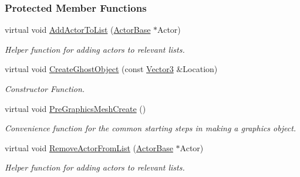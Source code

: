 \subsubsection*{Protected Member Functions}
\begin{DoxyCompactItemize}
\item 
\hypertarget{classMezzanine_1_1AreaEffect_a4a81d9d5920f375aa9a5ff27c1de97e0}{
virtual void \hyperlink{classMezzanine_1_1AreaEffect_a4a81d9d5920f375aa9a5ff27c1de97e0}{AddActorToList} (\hyperlink{classMezzanine_1_1ActorBase}{ActorBase} $\ast$Actor)}
\label{classMezzanine_1_1AreaEffect_a4a81d9d5920f375aa9a5ff27c1de97e0}

\begin{DoxyCompactList}\small\item\em Helper function for adding actors to relevant lists. \item\end{DoxyCompactList}\item 
virtual void \hyperlink{classMezzanine_1_1AreaEffect_a198ad58cec706d508785cbd8e319ba54}{CreateGhostObject} (const \hyperlink{classMezzanine_1_1Vector3}{Vector3} \&Location)
\begin{DoxyCompactList}\small\item\em Constructor Function. \item\end{DoxyCompactList}\item 
\hypertarget{classMezzanine_1_1AreaEffect_ae6d32d28fbe74eec48eaf3f7b5550c1c}{
virtual void \hyperlink{classMezzanine_1_1AreaEffect_ae6d32d28fbe74eec48eaf3f7b5550c1c}{PreGraphicsMeshCreate} ()}
\label{classMezzanine_1_1AreaEffect_ae6d32d28fbe74eec48eaf3f7b5550c1c}

\begin{DoxyCompactList}\small\item\em Convenience function for the common starting steps in making a graphics object. \item\end{DoxyCompactList}\item 
\hypertarget{classMezzanine_1_1AreaEffect_a676a36ba3fb8b0d7ced951f1b5010852}{
virtual void \hyperlink{classMezzanine_1_1AreaEffect_a676a36ba3fb8b0d7ced951f1b5010852}{RemoveActorFromList} (\hyperlink{classMezzanine_1_1ActorBase}{ActorBase} $\ast$Actor)}
\label{classMezzanine_1_1AreaEffect_a676a36ba3fb8b0d7ced951f1b5010852}

\begin{DoxyCompactList}\small\item\em Helper function for adding actors to relevant lists. \item\end{DoxyCompactList}\end{DoxyCompactItemize}
